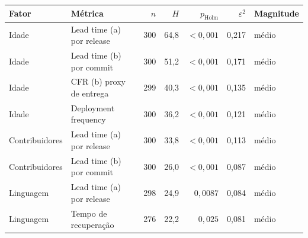 \begin{tabular}{llrrrrl}
\hline
Fator & Métrica & $n$ & $H$ & $p_{\mathrm{Holm}}$ & $\varepsilon^2$ & Magnitude \\ \hline
Idade & Lead time (a) por release & 300 & 64{,}8 & $<0{,}001$ & 0{,}217 & médio \\
Idade & Lead time (b) por commit & 300 & 51{,}2 & $<0{,}001$ & 0{,}171 & médio \\
Idade & CFR (b) proxy de entrega & 299 & 40{,}3 & $<0{,}001$ & 0{,}135 & médio \\
Idade & Deployment frequency & 300 & 36{,}2 & $<0{,}001$ & 0{,}121 & médio \\
Contribuidores & Lead time (a) por release & 300 & 33{,}8 & $<0{,}001$ & 0{,}113 & médio \\
Contribuidores & Lead time (b) por commit & 300 & 26{,}0 & $<0{,}001$ & 0{,}087 & médio \\
Linguagem & Lead time (a) por release & 298 & 24{,}9 & $0{{,}}0087$ & 0{,}084 & médio \\
Linguagem & Tempo de recuperação & 276 & 22{,}2 & $0{{,}}025$ & 0{,}081 & médio \\
\hline
\end{tabular}
